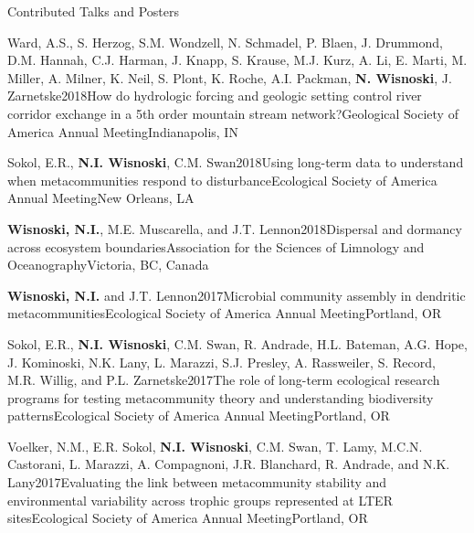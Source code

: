 \documentclass{resume} %
\begin{document}
\bigskip

\begin{rhangSection}{Contributed Talks and Posters}
  
  \begin{Presentation}{Ward, A.S., S. Herzog, S.M. Wondzell, N. Schmadel, P. Blaen, J. Drummond, D.M. Hannah, C.J. Harman, J. Knapp, S. Krause, M.J. Kurz, A. Li, E. Marti, M. Miller, A. Milner, K. Neil, S. Plont, K. Roche, A.I. Packman, {\bf N. Wisnoski}, J. Zarnetske}{2018}{How do hydrologic forcing and geologic setting control river corridor exchange in a 5th order mountain stream network?}{Geological Society of America Annual Meeting}{Indianapolis, IN}
  \end{Presentation}
  
  \begin{Presentation}{Sokol, E.R., {\bf N.I. Wisnoski}, C.M. Swan}{2018}{Using long-term data to understand when metacommunities respond to disturbance}{Ecological Society of America Annual Meeting}{New Orleans, LA}
  \end{Presentation}

  \begin{Presentation}{{\bf Wisnoski, N.I.}, M.E. Muscarella, and J.T. Lennon}{2018}{Dispersal and dormancy across ecosystem boundaries}{Association for the Sciences of Limnology and Oceanography}{Victoria, BC, Canada}
  \end{Presentation}

  \begin{Presentation}{{\bf Wisnoski, N.I.} and J.T. Lennon}{2017}{Microbial community assembly in dendritic metacommunities}{Ecological Society of America Annual Meeting}{Portland, OR}
  \end{Presentation}
  
  \begin{Presentation}{Sokol, E.R., {\bf N.I. Wisnoski}, C.M. Swan, R. Andrade, H.L. Bateman, A.G. Hope, J. Kominoski, N.K. Lany, L. Marazzi, S.J. Presley, A. Rassweiler, S. Record, M.R. Willig, and P.L.
Zarnetske}{2017}{The role of long-term ecological research programs for testing
metacommunity theory and understanding biodiversity patterns}{Ecological Society of
America Annual Meeting}{Portland, OR}
  \end{Presentation}
  
  \begin{Presentation}{Voelker, N.M., E.R. Sokol, {\bf N.I. Wisnoski}, C.M. Swan, T. Lamy, M.C.N. Castorani, L. Marazzi, A. Compagnoni, J.R. Blanchard, R. Andrade, and N.K. Lany}{2017}{Evaluating the link between metacommunity stability and environmental variability across trophic groups represented at LTER sites}{Ecological Society of America Annual Meeting}{Portland, OR}
  \end{Presentation}


\end{rhangSection}
\end{document}

